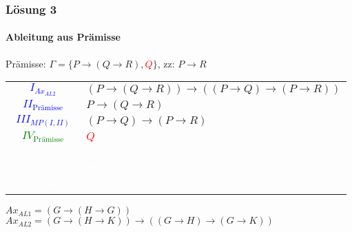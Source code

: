 \begin{frame}
	\frametitle{Lösung 3}
	\framesubtitle{Ableitung aus Prämisse}
	Prämisse: $\Gamma =\{P\rightarrow(Q\rightarrow R), $\textcolor{red}{$Q$}$\}$, zz: $P\rightarrow R$\\
	\begin{tabular}{cl}
		\textcolor{blue}{$I_{Ax_{AL2}}$}          & $(P\rightarrow(Q\rightarrow R))\rightarrow((P\rightarrow Q)\rightarrow(P\rightarrow R))$ \\
		\textcolor{blue}{$II_{\text{Prämisse}}$}  & $P\rightarrow(Q\rightarrow R)$                                                           \\
		\textcolor{blue}{$III_{MP(I, II)}$}       & $(P\rightarrow Q)\rightarrow(P\rightarrow R)$                                            \\
		\textcolor{green}{$IV_{\text{Prämisse}}$} & \textcolor{red}{$Q$}                                                                     \\
		\textcolor{white}{$V_{IV, Ax_{AL1}}$}     & \textcolor{white}{$Q\rightarrow(P\rightarrow Q)$}                                        \\
		\textcolor{white}{$VI_{MP(IV, V)}$}       & \textcolor{white}{$P\rightarrow Q$}                                                      \\
		\textcolor{white}{$VII_{MP(III, VI)}$}    & \textcolor{white}{$P\rightarrow R$}                                                      \\
	\end{tabular}
	$Ax_{AL1} = (G\rightarrow(H\rightarrow G))$\\
	$Ax_{AL2} = (G\rightarrow(H\rightarrow K))\rightarrow((G\rightarrow H)\rightarrow(G\rightarrow K))$\\
\end{frame}
